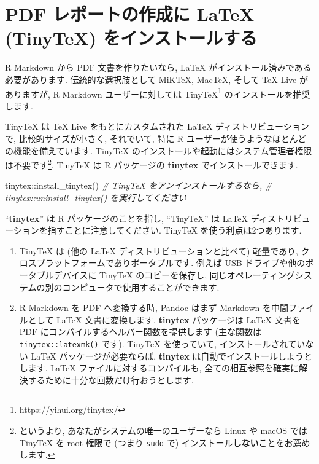 \documentclass[
  11pt,
  lualatex,ja=standard,jafont=noto]{bxjsreport}
\newenvironment{Shaded}{\begin{snugshade}}{\end{snugshade}}
\newcommand{\CommentTok}[1]{\textcolor[rgb]{0.56,0.35,0.01}{\textit{#1}}}
\newcommand{\FunctionTok}[1]{\textcolor[rgb]{0.00,0.00,0.00}{#1}}
\newcommand{\NormalTok}[1]{#1}
\newcommand{\SpecialCharTok}[1]{\textcolor[rgb]{0.00,0.00,0.00}{#1}}
\renewcommand{\href}[2]{#2\footnote{\url{#1}}}
\begin{document}
\hypertarget{install-latex}{%
\section{PDF レポートの作成に LaTeX (TinyTeX) をインストールする}\label{install-latex}}

R Markdown から PDF 文書を作りたいなら, LaTeX がインストール済みである必要があります. 伝統的な選択肢として MiKTeX, MacTeX, そして TeX Live がありますが, R Markdown ユーザーに対しては \href{https://yihui.org/tinytex/}{TinyTeX} のインストールを推奨します.

TinyTeX は TeX Live をもとにカスタムされた LaTeX ディストリビューションで, 比較的サイズが小さく, それでいて, 特に R ユーザーが使うようなほとんどの機能を備えています. TinyTeX のインストールや起動にはシステム管理者権限は不要です\footnote{というより, あなたがシステムの唯一のユーザーなら Linux や macOS では TinyTeX を root 権限で (つまり \texttt{sudo} で) インストール\textbf{しない}ことをお薦めします.}. TinyTeX は R パッケージの \textbf{tinytex} \autocite{R-tinytex} でインストールできます.

\begin{Shaded}
\begin{Highlighting}[numbers=left,,]
\NormalTok{tinytex}\SpecialCharTok{::}\FunctionTok{install\_tinytex}\NormalTok{()}
\CommentTok{\# TinyTeX をアンインストールするなら,}
\CommentTok{\# tinytex::uninstall\_tinytex() を実行してください}
\end{Highlighting}
\end{Shaded}

``\textbf{tinytex}'' は R パッケージのことを指し, ``TinyTeX'' は LaTeX ディストリビューションを指すことに注意してください. TinyTeX を使う利点は2つあります.

\begin{enumerate}
\def\labelenumi{\arabic{enumi}.}
\item
  TinyTeX は (他の LaTeX ディストリビューションと比べて) 軽量であり, クロスプラットフォームでありポータブルです. 例えば USB ドライブや他のポータブルデバイスに TinyTeX のコピーを保存し, 同じオペレーティングシステムの別のコンピュータで使用することができます.
\item
  R Markdown を PDF へ変換する時, Pandoc はまず Markdown を中間ファイルとして LaTeX 文書に変換します. \textbf{tinytex} パッケージは LaTeX 文書を PDF にコンパイルするヘルパー関数を提供します (主な関数は \texttt{tinytex::latexmk()} です). TinyTeX を使っていて, インストールされていない LaTeX パッケージが必要ならば, \textbf{tinytex} は自動でインストールしようとします. LaTeX ファイルに対するコンパイルも, 全ての相互参照を確実に解決するために十分な回数だけ行おうとします.
\end{enumerate}
\end{document}
